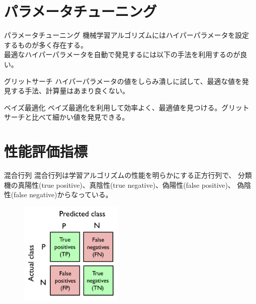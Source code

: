 \documentclass[aspectratio=169, dvipdfmx, 11pt]{beamer} %
\begin{document}
\section{パラメータチューニング}
\begin{frame}{パラメータチューニング}
    機械学習アルゴリズムにはハイパーパラメータを設定するものが多く存在する。\\
    最適なハイパーパラメータを自動で発見するには以下の手法を利用するのが良い。
    \vspace{1em}
    \begin{alertblock}{グリットサーチ}
        ハイパーパラメータの値をしらみ潰しに試して、最適な値を発見する手法、計算量はあまり良くない。
    \end{alertblock}
    \vspace{1em}
    \begin{exampleblock}{ベイズ最適化}
        ベイズ最適化を利用して効率よく、最適値を見つける。グリットサーチと比べて細かい値を発見できる。
    \end{exampleblock}
\end{frame}




\section{性能評価指標}
\begin{frame}{混合行列}
    混合行列は学習アルゴリズムの性能を明らかにする正方行列で、
    分類機の真陽性(true positive)、真陰性(true negative)、偽陽性(false positive)、
    偽陰性(false negative)からなっている。
    \vspace{1em}
    \begin{figure}[b]
        \begin{center}
        \includegraphics[width=50mm]{img/day06/fig05.png}
        \end{center}
    \end{figure}
\end{frame}
\end{document}
